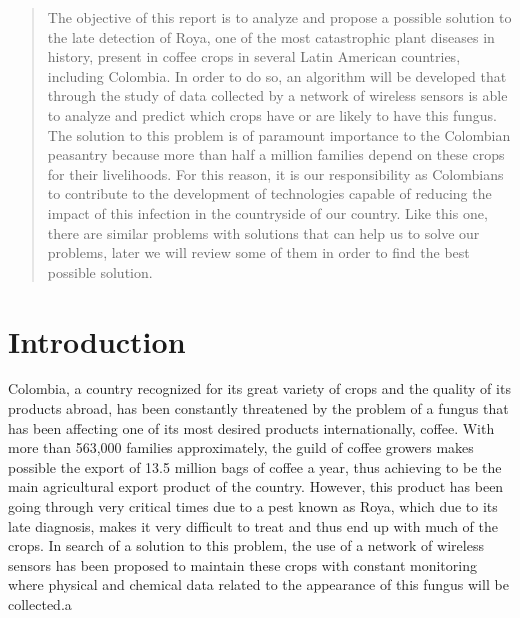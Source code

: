 \documentclass{acm_proc_article-sp}
\begin{document}
\maketitle
\begin{abstract}
The objective of this report is to analyze and propose a possible solution to the late detection of Roya, one of the most catastrophic plant diseases in history, present in coffee crops in several Latin American countries, including Colombia.  In order to do so, an algorithm will be developed that through the study of data collected by a network of wireless sensors is able to analyze and predict which crops have or are likely to have this fungus.
The solution to this problem is of paramount importance to the Colombian peasantry because more than half a million families depend on these crops for their livelihoods.  For this reason, it is our responsibility as Colombians to contribute to the development of technologies capable of reducing the impact of this infection in the countryside of our country. Like this one, there are similar problems with solutions that can help us to solve our problems, later we will review some of them in order to find the best possible solution.

\end{abstract}


%


%
%

%
%

\section{Introduction}
Colombia, a country recognized for its great variety of crops and the quality of its products abroad, has been constantly threatened by the problem of a fungus that has been affecting one of its most desired products internationally, coffee. With more than 563,000 families approximately, the guild of coffee growers makes possible the export of 13.5 million bags of coffee a year, thus achieving to be the main agricultural export product of the country. However, this product has been going through very critical times due to a pest known as Roya, which due to its late diagnosis, makes it very difficult to treat and thus end up with much of the crops.
In search of a solution to this problem, the use of a network of wireless sensors has been proposed to maintain these crops with constant monitoring where physical and chemical data related to the appearance of this fungus will be collected.a
\end{document}
